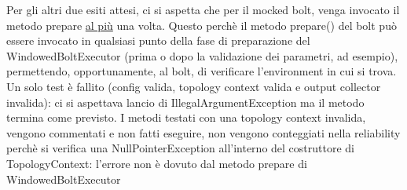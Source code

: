 \documentclass[10pt, a4paper]{article}
\begin{document}
	Per gli altri due esiti attesi, ci si aspetta che per il mocked bolt, venga invocato il metodo prepare \underline{al più} una
	volta.
	Questo perchè il metodo prepare() del bolt può essere invocato in qualsiasi punto della fase di preparazione del
	WindowedBoltExecutor (prima o dopo la validazione dei parametri, ad esempio), permettendo, opportunamente, al bolt, di
	verificare l'environment in cui si trova.
	Un solo test è fallito (config valida, topology context valida e output collector invalida): ci si aspettava lancio di 
	IllegalArgumentException ma il metodo termina come previsto.
	I metodi testati con una topology context invalida, vengono commentati e non fatti eseguire, non vengono conteggiati nella
	reliability perchè si verifica una NullPointerException all'interno del costruttore di TopologyContext: l'errore non è dovuto
	dal metodo prepare di WindowedBoltExecutor
	
\end{document}
